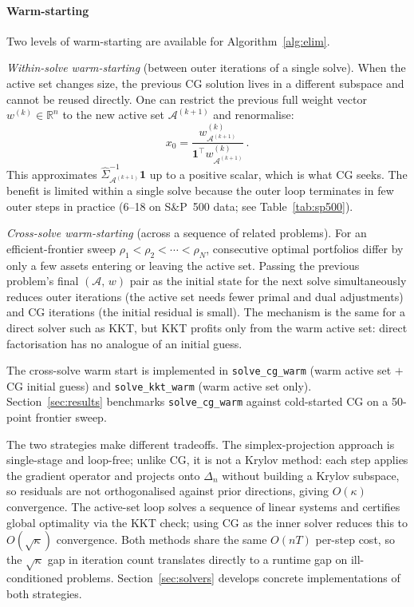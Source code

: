 \paragraph{Warm-starting}
Two levels of warm-starting are available for Algorithm~\ref{alg:elim}.

\emph{Within-solve warm-starting} (between outer iterations of a single solve).
When the active set changes size, the previous CG solution lives in a different
subspace and cannot be reused directly. One can restrict the previous full
weight vector $w^{(k)} \in \mathbb{R}^n$ to the new active set
$\mathcal{A}^{(k+1)}$ and renormalise:
\[
  x_0 = \frac{w^{(k)}_{\mathcal{A}^{(k+1)}}}
             {\mathbf{1}^\top w^{(k)}_{\mathcal{A}^{(k+1)}}}\,.
\]
This approximates $\hat\Sigma_{\mathcal{A}^{(k+1)}}^{-1}\mathbf{1}$ up to a
positive scalar, which is what CG seeks.
The benefit is limited within a single solve because the outer loop terminates in few outer steps in practice (6--18 on S\&P~500 data; see Table~\ref{tab:sp500}).

\emph{Cross-solve warm-starting} (across a sequence of related problems).
For an efficient-frontier sweep $\rho_1 < \rho_2 < \cdots < \rho_N$, consecutive
optimal portfolios differ by only a few assets entering or leaving the active
set.
Passing the previous problem's final $(\mathcal{A},\,w)$ pair as the
initial state for the next solve simultaneously reduces outer iterations (the
active set needs fewer primal and dual adjustments) and CG iterations (the
initial residual is small).
The mechanism is the same for a direct solver
such as KKT, but KKT profits only from the warm active set: direct
factorisation has no analogue of an initial guess.

The cross-solve warm start is implemented in \texttt{solve\_cg\_warm}
(warm active set $+$ CG initial guess) and \texttt{solve\_kkt\_warm}
(warm active set only).  Section~\ref{sec:results} benchmarks \texttt{solve\_cg\_warm}
against cold-started CG on a 50-point frontier sweep.

\medskip
The two strategies make different tradeoffs. The simplex-projection approach is
single-stage and loop-free; unlike CG, it is not a Krylov method: each step applies
the gradient operator and projects onto $\Delta_n$ without building a Krylov subspace,
so residuals are not orthogonalised against prior directions, giving $O(\kappa)$
convergence. The active-set loop solves a sequence of linear systems and certifies
global optimality via the KKT check; using CG as the inner solver reduces this to
$O(\sqrt{\kappa})$ convergence. Both methods share the same $O(nT)$ per-step cost,
so the $\sqrt{\kappa}$ gap in iteration count translates directly to a runtime gap on
ill-conditioned problems.
Section~\ref{sec:solvers} develops concrete implementations of both strategies.
